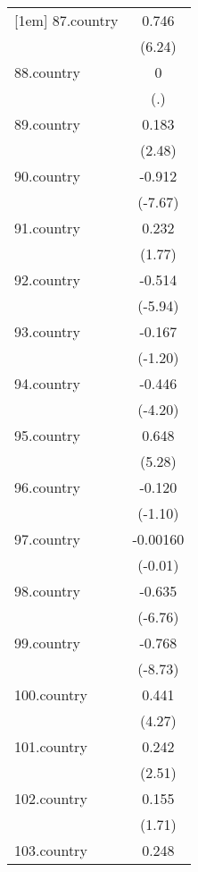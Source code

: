 {\begin{tabular}{l*{1}{c}}
[1em]
87.country  &       0.746\sym{***}\\
            &      (6.24)         \\
[1em]
88.country  &           0         \\
            &         (.)         \\
[1em]
89.country  &       0.183\sym{*}  \\
            &      (2.48)         \\
[1em]
90.country  &      -0.912\sym{***}\\
            &     (-7.67)         \\
[1em]
91.country  &       0.232         \\
            &      (1.77)         \\
[1em]
92.country  &      -0.514\sym{***}\\
            &     (-5.94)         \\
[1em]
93.country  &      -0.167         \\
            &     (-1.20)         \\
[1em]
94.country  &      -0.446\sym{***}\\
            &     (-4.20)         \\
[1em]
95.country  &       0.648\sym{***}\\
            &      (5.28)         \\
[1em]
96.country  &      -0.120         \\
            &     (-1.10)         \\
[1em]
97.country  &    -0.00160         \\
            &     (-0.01)         \\
[1em]
98.country  &      -0.635\sym{***}\\
            &     (-6.76)         \\
[1em]
99.country  &      -0.768\sym{***}\\
            &     (-8.73)         \\
[1em]
100.country &       0.441\sym{***}\\
            &      (4.27)         \\
[1em]
101.country &       0.242\sym{*}  \\
            &      (2.51)         \\
[1em]
102.country &       0.155         \\
            &      (1.71)         \\
[1em]
103.country &       0.248\sym{**} \\

\end{tabular}}
